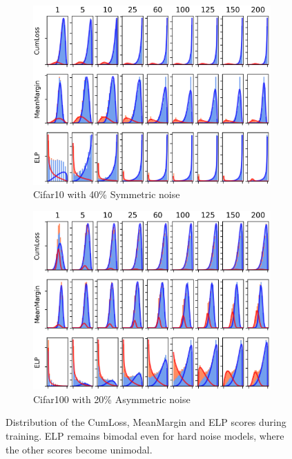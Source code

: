\documentclass{article}
\begin{document}
\begin{figure}[htbp]
\centering
\begin{subfigure}[tb]{0.485\textwidth}
  \includegraphics[width=\linewidth]{figs/Dense100-40-hist.png}
  \centering
  \caption{Cifar10 with 40\% Symmetric noise}
      \label{fig:score-comparisons-easy}
  \end{subfigure}
  \hfill
  \begin{subfigure}[tb]{0.485\textwidth}
  \includegraphics[width=\linewidth]{figs/dense100-40.png}
  \centering
  \caption{Cifar100 with 20\% Asymmetric noise}
      \label{fig:score-comparisons-hard}
  \end{subfigure}
      \caption[Estimation]{Distribution of the CumLoss, MeanMargin and ELP scores during training. ELP remains bimodal even for hard noise models, where the other scores become unimodal. }
      \label{fig:score-comparisons}
\end{figure}
\end{document}
